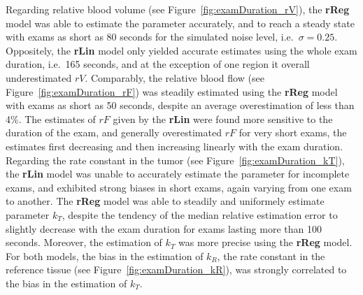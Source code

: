 Regarding relative blood volume (see Figure~\ref{fig:examDuration_rV}), the \textbf{rReg} model was able to estimate the parameter accurately, and to reach a steady state with exams as short as 80 seconds for the simulated noise level, i.e.~$\sigma = 0.25$.
Oppositely, the \textbf{rLin} model only yielded accurate estimates using the whole exam duration, i.e.~165 seconds, and at the exception of one region it overall underestimated $rV$.
Comparably, the relative blood flow (see Figure~\ref{fig:examDuration_rF}) was steadily estimated using the \textbf{rReg} model with exams as short as 50 seconds, despite an average overestimation of less than 4\%.
The estimates of $rF$ given by the \textbf{rLin} were found more sensitive to the duration of the exam, and generally overestimated $rF$ for very short exams, the estimates first decreasing and then increasing linearly with the exam duration.
Regarding the rate constant in the tumor (see Figure~\ref{fig:examDuration_kT}), the \textbf{rLin} model was unable to accurately estimate the parameter for incomplete exams, and exhibited strong biases in short exams, again varying from one exam to another. 
The \textbf{rReg} model was able to steadily and uniformely estimate parameter $k_T$, despite the tendency of the median relative estimation error to slightly decrease with the exam duration for exams lasting more than 100 seconds.
Moreover, the estimation of $k_T$ was more precise using the \textbf{rReg} model.
For both models, the bias in the estimation of $k_R$, the rate constant in the reference tissue (see Figure~\ref{fig:examDuration_kR}), was strongly correlated to the bias in the estimation of $k_T$.

